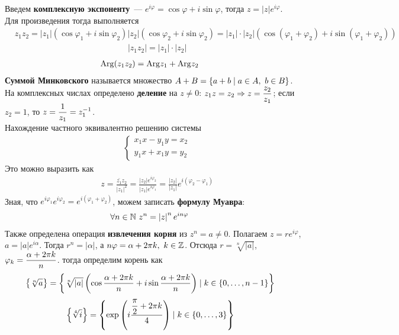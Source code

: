 Введем \textbf{комплексную экспоненту}~--- $e^{i\varphi} = \cos \varphi + i \sin
\varphi$, тогда $z = \left| z \right|e^{i\varphi}$.
\\
Для произведения тогда выполняется
\begin{align*}
  & z_1z_2 = \left| z_1 \right|\left( \cos \varphi_1 + i \sin \varphi_2 \right)\left| z_2 \right|\left( \cos \varphi_2 + i \sin \varphi_2 \right) = \left| z_1 \right|\cdot \left| z_2 \right| \left( \cos \left( \varphi_1+\varphi_2 \right) + i \sin \left( \varphi_1+\varphi_2 \right)\right)
\end{align*}
\begin{align*}
  & \left|z_1z_2\right| = \left| z_1 \right|\cdot \left| z_2 \right|
\end{align*}
\begin{align*}
  & \mathrm{Arg}(z_1z_2) = \mathrm{Arg} z_1 + \mathrm{Arg} z_2
\end{align*}
\textbf{Суммой Минковского} называется множество $A+B = \left\{{a+b \mid a\in A, \
  b \in B}\right\}$.
\\
На комплексных числах определено \textbf{деление} на $z\neq 0$: $z_1z = z_2
\Rightarrow z = \displaystyle \frac{z_2}{z_1}$; если $z_2=1$, то $z = \displaystyle \frac{1}{z_1}
= z_1^{-1}$.
\\
Нахождение частного эквивалентно решению системы
\begin{align*}
  & \left\{ \begin{matrix}
          x_1x-y_1y=x_2 \\
          y_1x+x_1y = y_2
      \end{matrix} \right.
\end{align*}
Это можно выразить как
\begin{align*}
  & z = \frac{\bar{z_1}z_2}{\left| z_1 \right|^2} = \frac{\left| z_2 \right|e^{i \varphi_2}}{\left| z_1 \right| e^{i \varphi_1}} = \frac{\left| z_2 \right|}{\left| z_1 \right|}e^{i\left( \varphi_2-\varphi_1 \right)}
\end{align*}
Зная, что $e^{i \varphi_1}e^{i \varphi_2} = e^{i\left( \varphi_1+\varphi_2
  \right)}$, можем записать \textbf{формулу Муавра}:
\begin{align*}
  & \forall n \in \mathbb{N} \ z^n = \left| z \right|^ne^{i n \varphi} 
\end{align*}
Также определена операция \textbf{извлечения корня} из $z^n = a \neq 0$.
Полагаем $z=re^{i\varphi}$, $a = \left| a \right|e^{i\alpha}$. Тогда $r^n =
\left| \alpha \right|$, а $n \varphi = \alpha + 2 \pi k, \ k \in \mathbb{Z}$. Отсюда $r
= \sqrt[n]{\left| a \right|}$, $\varphi_k = \displaystyle \frac{\alpha+2\pi k}{n}$. тогда
определим корень как
\begin{align*}
  & \left\{{\sqrt[n]{a}}\right\} = \left\{{\sqrt[n]{\left| a \right|}\left( \cos \frac{\alpha + 2 \pi k}{n} + i \sin \frac{\alpha + 2 \pi k}{n} \right)\mid k \in \{0, \dots, n-1\}}\right\}
\end{align*}
\Example
\begin{align*}
  & \left\{{\sqrt[4]{i}}\right\} = \left\{{\exp\left( i \frac{\displaystyle \frac{\pi}{2} + 2 \pi k}{4} \right)\mid k \in \{0, \dots, 3\}}\right\}
\end{align*}
